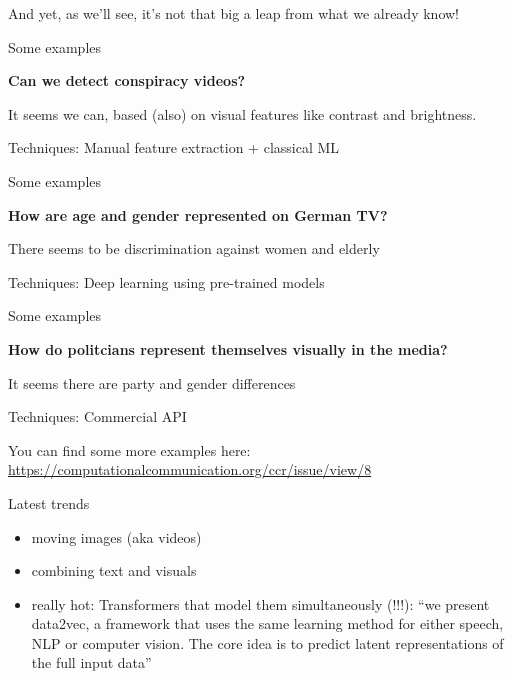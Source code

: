\begin{frame}[standout]
And yet, as we'll see, it's not that big a leap from what we already know!
\end{frame}


\begin{frame}{Some examples}
  \begin{block}{\cite{Chen2022}}
    \textbf{Can we detect conspiracy videos?}

    It seems we can, based (also) on visual features like contrast and brightness.

    Techniques: Manual feature extraction + classical ML
  \end{block}
\end{frame}


\begin{frame}{Some examples}
  \begin{block}{\cite{Jurgens2022}}
    \textbf{How are age and gender represented on German TV?}

    There seems to be discrimination against women and elderly

    Techniques: Deep learning using pre-trained models
  \end{block}
\end{frame}



\begin{frame}{Some examples}
  \begin{block}{\cite{Joo2022}}
    \textbf{How do politcians represent themselves visually in the media?}

    It seems there are party and gender differences
    
    Techniques: Commercial API
  \end{block}
\end{frame}


\begin{frame}[standout]
  You can find some more examples here:
  \url{https://computationalcommunication.org/ccr/issue/view/8}
\end{frame}

\begin{frame}{Latest trends}
  \begin{itemize}
  \item moving images (aka videos)
  \item combining text and visuals
  \item really hot: Transformers that model them simultaneously (!!!): ``we present data2vec, a framework that uses the same learning method for either speech, NLP or computer vision. The core idea is to predict latent representations of the full input data'' \parencite{Baevski2022}
  \end{itemize}

\end{frame}



